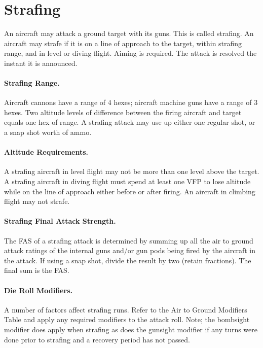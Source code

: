 

\section{Strafing}
\label{rule:strafing}

An aircraft may attack a ground target with its guns. This is called strafing. An aircraft may strafe if it is on a line of approach to the target, within strafing range, and in level or diving flight. Aiming is required. The attack is resolved the instant it is announced.

\paragraph{Strafing Range.} Aircraft cannons have a range of 4 hexes; aircraft machine guns have a range of 3 hexes. Two altitude levels of difference between the firing aircraft and target equals one hex of range. A strafing attack may use up either one regular shot, or a snap shot worth of ammo.

\paragraph{Altitude Requirements.} A strafing aircraft in level flight may not be more than one level above the target. A strafing aircraft in diving flight must spend at least one VFP to lose altitude while on the line of approach either before or after firing. An aircraft in climbing flight may not strafe.

\paragraph{Strafing Final Attack Strength.} The FAS of a strafing attack is determined by summing up all the air to ground attack ratings of the internal guns and/or gun pods being fired by the aircraft in the attack. If using a snap shot, divide the result by two (retain fractions). The final sum is the FAS.

\paragraph{Die Roll Modifiers.} A number of factors affect strafing runs. Refer to the Air to Ground Modifiers Table and apply any required modifiers to the attack roll. Note; the bombsight modifier does apply when strafing as does the gunsight modifier if any turns were done prior to strafing and a recovery period has not passed.

